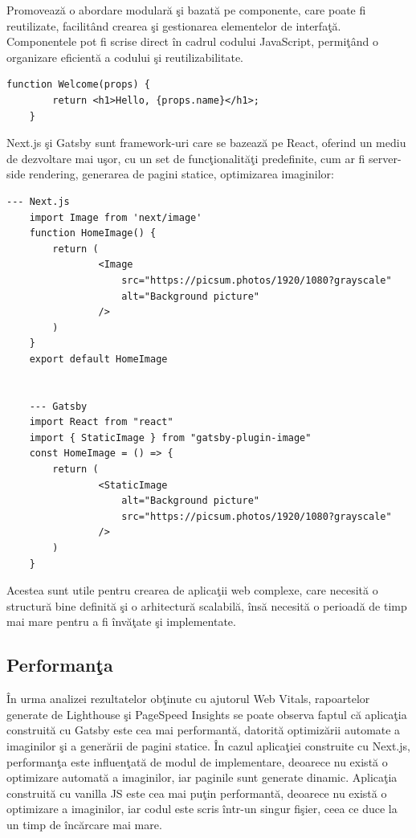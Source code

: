 \documentclass[12pt, a4paper]{report}
\begin{document}
Promoveaz\u a o abordare modular\u a \c si bazat\u a pe componente, care poate fi reutilizate, facilit\^and crearea \c si gestionarea elementelor de interfa\c t\u a. Componentele pot fi scrise direct \^in cadrul codului JavaScript, permi\c t\^and o organizare eficient\u a a codului \c si reutilizabilitate.

\begin{lstlisting}[caption={Exemplu de component\u a React},captionpos=b]
	function Welcome(props) {
		return <h1>Hello, {props.name}</h1>;
	}
\end{lstlisting}

Next.js \c si Gatsby sunt framework-uri care se bazeaz\u a pe React, oferind un mediu de dezvoltare mai u\c sor, cu un set de func\c tionalit\u a\c ti predefinite, cum ar fi server-side rendering, generarea de pagini statice, optimizarea imaginilor:

\begin{lstlisting}[caption={Exemplu de utilizare a unei imagini optimizate automat \^in Next.js \c si Gatsby},captionpos=b]
	--- Next.js
	import Image from 'next/image'
	function HomeImage() {
		return (
				<Image
					src="https://picsum.photos/1920/1080?grayscale"
					alt="Background picture"
				/>
		)
	}
	export default HomeImage

	
	--- Gatsby
	import React from "react"
	import { StaticImage } from "gatsby-plugin-image"
	const HomeImage = () => {
		return (
				<StaticImage
					alt="Background picture"
					src="https://picsum.photos/1920/1080?grayscale"
				/>
		)
	}
\end{lstlisting} \label{fig:image-optimization}

Acestea sunt utile pentru crearea de aplica\c tii web complexe, care necesit\u a o structur\u a bine definit\u a \c si o arhitectur\u a scalabil\u a, \^ins\u a necesit\u a o perioad\u a de timp mai mare pentru a fi \^inv\u a\c tate \c si implementate.

\subsection{Performan\c ta}

\^In urma analizei rezultatelor ob\c tinute cu ajutorul Web Vitals, rapoartelor generate de Lighthouse \c si PageSpeed Insights se poate observa faptul c\u a aplica\c tia construit\u a cu Gatsby este cea mai performant\u a, datorit\u a optimiz\u arii automate a imaginilor \c si a gener\u arii de pagini statice. \^In cazul aplica\c tiei construite cu Next.js, performan\c ta este influen\c tat\u a de modul de implementare, deoarece nu exist\u a o optimizare automat\u a a imaginilor, iar paginile sunt generate dinamic. Aplica\c tia construit\u a cu vanilla JS este cea mai pu\c tin performant\u a, deoarece nu exist\u a o optimizare a imaginilor, iar codul este scris \^intr-un singur fi\c sier, ceea ce duce la un timp de \^inc\u arcare mai mare.
\end{document}
